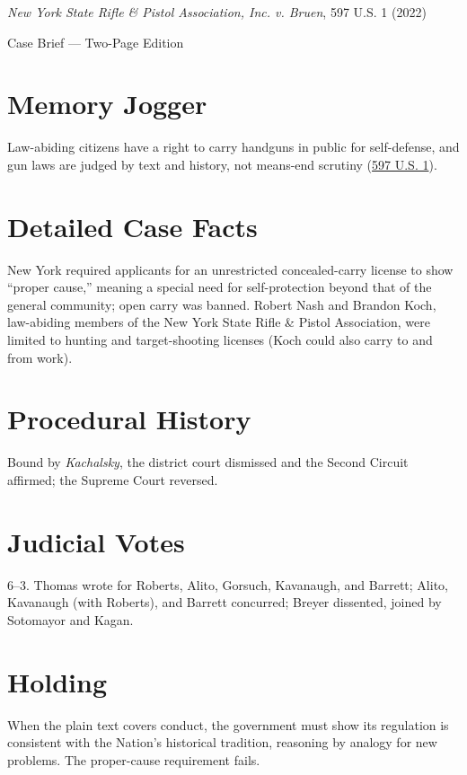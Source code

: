 \documentclass[12pt]{article}
\begin{document}
\begin{center}
{\LARGE \textit{New York State Rifle \& Pistol Association, Inc. v. Bruen}, 597 U.S. 1 (2022)\par}
\vspace{0.5em}
{\large Case Brief --- Two-Page Edition\par}
\end{center}

\section{Memory Jogger}
Law-abiding citizens have a right to carry handguns in public for self-defense, and gun laws are judged by text and history, not means-end scrutiny (\href{https://www.law.cornell.edu/supremecourt/text/20-843}{597 U.S. 1}).

\section{Detailed Case Facts}
New York required applicants for an unrestricted concealed-carry license to show ``proper cause,'' meaning a special need for self-protection beyond that of the general community; open carry was banned. Robert Nash and Brandon Koch, law-abiding members of the New York State Rifle \& Pistol Association, were limited to hunting and target-shooting licenses (Koch could also carry to and from work).

\section{Procedural History}
Bound by \textit{Kachalsky}, the district court dismissed and the Second Circuit affirmed; the Supreme Court reversed.

\section{Judicial Votes}
6--3. Thomas wrote for Roberts, Alito, Gorsuch, Kavanaugh, and Barrett; Alito, Kavanaugh (with Roberts), and Barrett concurred; Breyer dissented, joined by Sotomayor and Kagan.

\section{Holding}
When the plain text covers conduct, the government must show its regulation is consistent with the Nation's historical tradition, reasoning by analogy for new problems. The proper-cause requirement fails.
\end{document}
